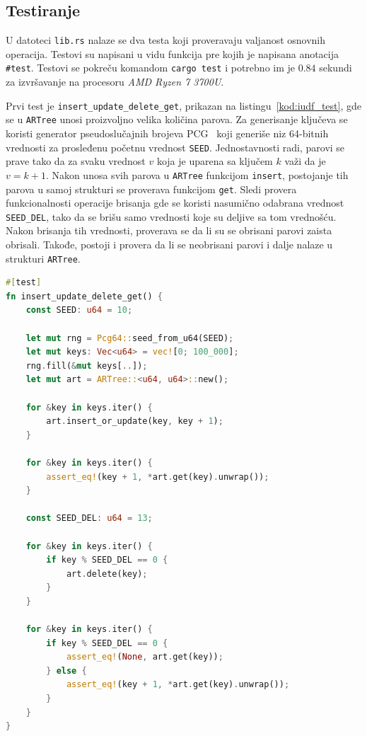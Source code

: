 \documentclass[12pt,oneside]{memoir}
\begin{document}
\subsection{Testiranje}
U datoteci \texttt{lib.rs} nalaze se dva testa koji proveravaju
valjanost osnovnih operacija. Testovi su napisani u vidu funkcija
pre kojih je napisana anotacija \texttt{\#\lbrack test\rbrack}.
Testovi se pokreču komandom \texttt{cargo test} i potrebno
im je $0.84$ sekundi za izvršavanje na procesoru
\textit{AMD Ryzen 7 3700U}.

Prvi test je \texttt{insert\_update\_delete\_get}, prikazan na
listingu~\ref{kod:iudf_test}, gde se
u \texttt{ARTree} unosi proizvoljno velika količina parova.
Za generisanje ključeva se koristi generator
pseudoslučajnih brojeva PCG~\cite{pcg} koji generiše niz
64-bitnih vrednosti za prosleđenu početnu vrednost \texttt{SEED}.
Jednostavnosti radi, parovi se prave tako da
za svaku vrednost $v$ koja je uparena sa ključem $k$
važi da je $v = k + 1$. Nakon unosa svih parova u \texttt{ARTree} funkcijom
\texttt{insert}, postojanje tih parova u samoj strukturi
se proverava funkcijom \texttt{get}. Sledi provera funkcionalnosti
operacije brisanja gde se koristi nasumično odabrana vrednost
\texttt{SEED\_DEL}, tako da se brišu samo vrednosti koje su deljive
sa tom vrednošću. Nakon brisanja tih vrednosti, proverava se
da li su se obrisani parovi zaista obrisali. Takođe, postoji i
provera da li se neobrisani parovi i dalje nalaze u strukturi \texttt{ARTree}.\

\begin{lstlisting}[language=Rust,
                   caption={Test \texttt{insert\_update\_delete\_get}},
                   label={kod:iudf_test}]
#[test]
fn insert_update_delete_get() {
    const SEED: u64 = 10;

    let mut rng = Pcg64::seed_from_u64(SEED);
    let mut keys: Vec<u64> = vec![0; 100_000];
    rng.fill(&mut keys[..]);
    let mut art = ARTree::<u64, u64>::new();

    for &key in keys.iter() {
        art.insert_or_update(key, key + 1);
    }

    for &key in keys.iter() {
        assert_eq!(key + 1, *art.get(key).unwrap());
    }

    const SEED_DEL: u64 = 13;

    for &key in keys.iter() {
        if key % SEED_DEL == 0 {
            art.delete(key);
        }
    }

    for &key in keys.iter() {
        if key % SEED_DEL == 0 {
            assert_eq!(None, art.get(key));
        } else {
            assert_eq!(key + 1, *art.get(key).unwrap());
        }
    }
}
\end{lstlisting}
\end{document}
